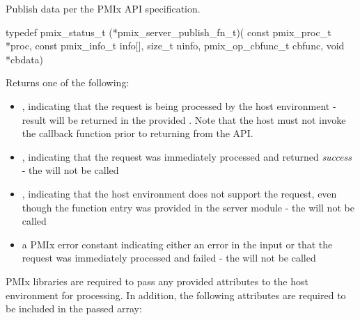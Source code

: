 \summary

Publish data per the PMIx API specification.

\format

\cspecificstart
\begin{codepar}
typedef pmix_status_t (*pmix_server_publish_fn_t)(
                             const pmix_proc_t *proc,
                             const pmix_info_t info[],
                             size_t ninfo,
                             pmix_op_cbfunc_t cbfunc,
                             void *cbdata)
\end{codepar}
\cspecificend

\begin{arglist}
\end{arglist}

Returns one of the following:

\begin{itemize}
    \item {}, indicating that the request is being processed by the host environment - result will be returned in the provided . Note that the host must not invoke the callback function prior to returning from the \ac{API}.
    \item {}, indicating that the request was immediately processed and returned \textit{success} - the  will not be called
    \item {}, indicating that the host environment does not support the request, even though the function entry was provided in the server module - the  will not be called
    \item a PMIx error constant indicating either an error in the input or that the request was immediately processed and failed - the  will not be called
\end{itemize}

\reqattrstart
\ac{PMIx} libraries are required to pass any provided attributes to the host environment for processing. In addition, the following attributes are required to be included in the passed  array:

